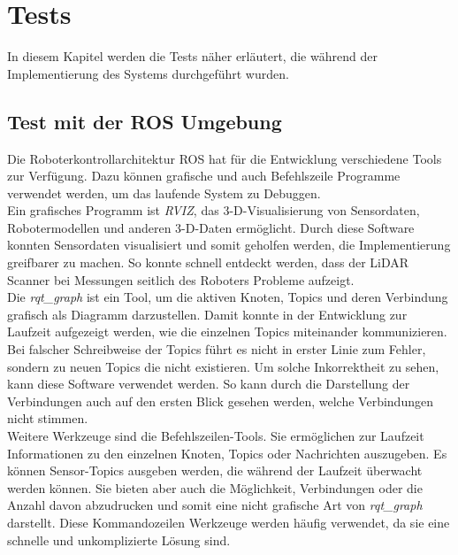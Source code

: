 \chapter{Tests}
In diesem Kapitel werden die Tests näher erläutert, die während der Implementierung des Systems durchgeführt wurden.

\section{Test mit der ROS Umgebung}

Die Roboterkontrollarchitektur ROS hat für die Entwicklung verschiedene Tools zur Verfügung. Dazu können grafische und auch Befehlszeile Programme verwendet werden, um das laufende System zu Debuggen.\\
Ein grafisches Programm ist \textit{RVIZ}, das 3-D-Visualisierung von Sensordaten, Robotermodellen und anderen 3-D-Daten ermöglicht. Durch diese Software konnten Sensordaten visualisiert und somit geholfen werden, die Implementierung greifbarer zu machen. So konnte schnell entdeckt werden, dass der LiDAR Scanner bei Messungen seitlich des Roboters Probleme aufzeigt.\\
Die \textit{rqt\_graph} ist ein Tool, um die aktiven Knoten, Topics und deren Verbindung grafisch als Diagramm darzustellen. Damit konnte in der Entwicklung zur Laufzeit aufgezeigt werden, wie die einzelnen Topics miteinander kommunizieren. Bei falscher Schreibweise der Topics führt es nicht in erster Linie zum Fehler, sondern zu neuen Topics die nicht existieren. Um solche Inkorrektheit zu sehen, kann diese Software verwendet werden. So kann durch die Darstellung der Verbindungen auch auf den ersten Blick gesehen werden, welche Verbindungen nicht stimmen. \\
Weitere Werkzeuge sind die Befehlszeilen-Tools. Sie ermöglichen zur Laufzeit Informationen zu den einzelnen Knoten, Topics oder Nachrichten auszugeben. Es können Sensor-Topics ausgeben werden, die während der Laufzeit überwacht werden können. Sie bieten aber auch die Möglichkeit, Verbindungen oder die Anzahl davon abzudrucken und somit eine nicht grafische Art von \textit{rqt\_graph} darstellt. Diese Kommandozeilen Werkzeuge werden häufig verwendet, da sie eine schnelle und unkomplizierte Lösung sind.

